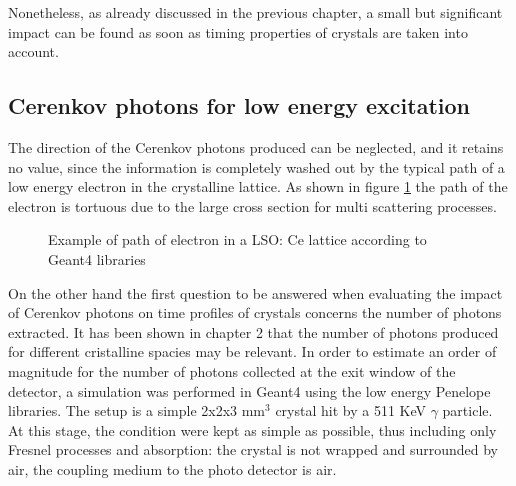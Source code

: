 Nonetheless, as already discussed in the previous chapter, a small but significant impact can be found as soon as timing properties of crystals are taken into account.
\subsection{Cerenkov photons for low energy excitation}
The direction of the Cerenkov photons produced can be neglected, and it retains no value, since the information is completely washed out by the typical path of a low energy electron in the crystalline lattice.
As shown in figure \ref{fig:electron} the path of the electron is tortuous due to the large cross section for multi scattering processes.
\begin{figure}[htbp]
\begin{center}
\end{center}
\caption[Electron path in lattice]{Example of path of electron in a LSO: Ce lattice according to Geant4 libraries}
\label{fig:electron}
\end{figure}
On the other hand the first question to be answered when evaluating the impact of Cerenkov photons on time profiles of crystals concerns the number of photons extracted.
It has been shown in chapter 2 that the number of photons produced for different cristalline spacies may be relevant. 
In order to estimate an order of magnitude for the number of photons collected at the exit window of the detector, a simulation was performed in Geant4 using the low energy Penelope libraries. The setup is a simple 2x2x3 mm$^{3}$ crystal hit by a 511 KeV $\gamma$ particle. At this stage, the condition were kept as simple as possible, thus including only Fresnel processes and absorption: the crystal is not wrapped and surrounded by air, the coupling medium to the photo detector is air.

